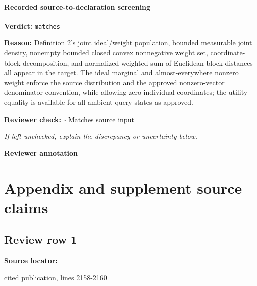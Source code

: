 \documentclass[10pt]{article}
\newcommand{\reviewerbox}{%
  \par\noindent\fbox{\parbox{0.96\linewidth}{\rule{0pt}{0.38in}}}\par
}
\newcommand{\reviewmatch}[1]{%
  \par\noindent\textbf{Reviewer check:} $\square$\; #1\par
  \noindent\emph{If left unchecked, explain the discrepancy or uncertainty below.}\par
}
\begin{document}
\paragraph{Recorded source-to-declaration screening}
\textbf{Verdict:} \texttt{matches}
\\
{\raggedright
\textbf{Reason:} Definition 2's joint ideal/\allowbreak{}weight population, bounded measurable joint density, nonempty bounded closed convex nonnegative weight set, coordinate-\allowbreak{}block decomposition, and normalized weighted sum of Euclidean block distances all appear in the target.\allowbreak{} The ideal marginal and almost-\allowbreak{}everywhere nonzero weight enforce the source distribution and the approved nonzero-\allowbreak{}vector denominator convention, while allowing zero individual coordinates;\allowbreak{} the utility equality is available for all ambient query states as approved.\allowbreak{}
\par}
\reviewmatch{Matches source input}
\noindent\textbf{Reviewer annotation}\par
\reviewerbox

\clearpage
\hypertarget{source-claim-ecf761bbd6bd7ecd}{}
\hypertarget{source-section-1743f0a28d68d6cc}{}
\section*{Appendix and supplement source claims}
\subsection*{Review row 1}
\textbf{Source locator:} {\footnotesize\raggedright cited publication, lines 2158-\allowbreak{}2160\par}
\end{document}
